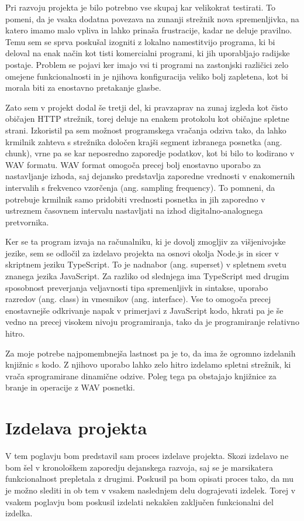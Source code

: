 \documentclass[12pt,a4paper,twoside,openright,slovene]{book}
\begin{document}
Pri razvoju projekta je bilo potrebno vse skupaj kar velikokrat testirati. To pomeni, da je vsaka dodatna povezava na zunanji strežnik nova spremenljivka, na katero imamo malo vpliva in lahko prinaša frustracije, kadar ne deluje pravilno. Temu sem se sprva poskušal izogniti z lokalno namestitvijo programa, ki bi deloval na enak način kot tisti komercialni programi, ki jih uporabljajo radijske postaje. Problem se pojavi ker imajo vsi ti programi na zastonjski različici zelo omejene funkcionalnosti in je njihova konfiguracija veliko bolj zapletena, kot bi morala biti za enostavno pretakanje glasbe.

Zato sem v projekt dodal še tretji del, ki pravzaprav na zunaj izgleda kot čisto običajen HTTP strežnik, torej deluje na enakem protokolu kot običajne spletne strani. Izkoristil pa sem možnost programskega vračanja odziva tako, da lahko krmilnik zahteva s strežnika določen krajši segment izbranega posnetka (ang. chunk), vrne pa se kar neposredno zaporedje podatkov, kot bi bilo to kodirano v WAV formatu. WAV format omogoča precej bolj enostavno uporabo za nastavljanje izhoda, saj dejansko predstavlja zaporedne vrednosti v enakomernih intervalih s frekvenco vzorčenja (ang. sampling frequency). To pomneni, da potrebuje krmilnik samo pridobiti vrednosti posnetka in jih zaporedno v ustreznem časovnem intervalu nastavljati na izhod digitalno-analognega pretvornika. 

Ker se ta program izvaja na računalniku, ki je dovolj zmogljiv za višjenivojske jezike, sem se odločil za izdelavo projekta na osnovi okolja Node.js in sicer v skriptnem jeziku TypeScript. To je nadnabor (ang. superset) v spletnem svetu znanega jezika JavaScript. Za razliko od slednjega ima TypeScript med drugim sposobnost preverjanja veljavnosti tipa spremenljivk in sintakse, uporabo razredov (ang. class) in vmesnikov (ang. interface). Vse to omogoča precej enostavnejše odkrivanje napak v primerjavi z JavaScript kodo, hkrati pa je še vedno na precej visokem nivoju programiranja, tako da je programiranje relativno hitro.

Za moje potrebe najpomembnejša lastnost pa je to, da ima že ogromno izdelanih knjižnic s kodo. Z njihovo uporabo lahko zelo hitro izdelamo spletni strežnik, ki vrača sprogramirane dinamične odzive. Poleg tega pa obstajajo knjižnice za branje in operacije z WAV posnetki.





\chapter{Izdelava projekta} \label{izdelava}
V tem poglavju bom predstavil sam proces izdelave projekta. Skozi izdelavo ne bom šel v kronološkem zaporedju dejanskega razvoja, saj se je marsikatera funkcionalnost prepletala z drugimi. Poskusil pa bom opisati proces tako, da mu je možno slediti in ob tem v vsakem naslednjem delu dograjevati izdelek. Torej v vsakem poglavju bom poskusil izdelati nekakšen zaključen funkcionalni del izdelka.
\end{document}
